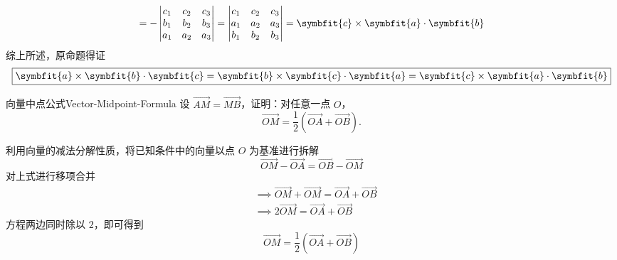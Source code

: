 \begin{myproof}
\begin{equation*}
        = - \begin{vmatrix} c_1 & c_2 & c_3 \\ b_1 & b_2 & b_3 \\ a_1 & a_2 & a_3 \end{vmatrix}
        = \begin{vmatrix} c_1 & c_2 & c_3 \\ a_1 & a_2 & a_3 \\ b_1 & b_2 & b_3 \end{vmatrix} = \symbfit{c} \times \symbfit{a} \cdot \symbfit{b}
    \end{equation*}
    综上所述，原命题得证
    \begin{equation*}
        \boxed{\symbfit{a} \times \symbfit{b} \cdot \symbfit{c} = \symbfit{b} \times \symbfit{c} \cdot \symbfit{a} = \symbfit{c} \times \symbfit{a} \cdot \symbfit{b}}
    \end{equation*}
\end{myproof}


\begin{problem}{向量中点公式}{Vector-Midpoint-Formula}
    设 $\overrightarrow{AM} = \overrightarrow{MB}$，证明：对任意一点 $O$，
    \begin{equation*}
        \overrightarrow{OM} = \frac{1}{2} (\overrightarrow{OA} + \overrightarrow{OB}).
    \end{equation*}
\end{problem}

\begin{myproof}
    利用向量的减法分解性质，将已知条件中的向量以点 $O$ 为基准进行拆解
    \begin{equation*}
        \overrightarrow{OM} - \overrightarrow{OA} = \overrightarrow{OB} - \overrightarrow{OM}
    \end{equation*}
    对上式进行移项合并
    \begin{equation*}
        \begin{aligned}
             & \implies \overrightarrow{OM} + \overrightarrow{OM} = \overrightarrow{OA} + \overrightarrow{OB} \\
             & \implies 2 \overrightarrow{OM} = \overrightarrow{OA} + \overrightarrow{OB}
        \end{aligned}
    \end{equation*}
    方程两边同时除以 $2$，即可得到
    \begin{equation*}
        \boxed{\overrightarrow{OM} = \frac{1}{2} (\overrightarrow{OA} + \overrightarrow{OB})}
    \end{equation*}
\end{myproof}


